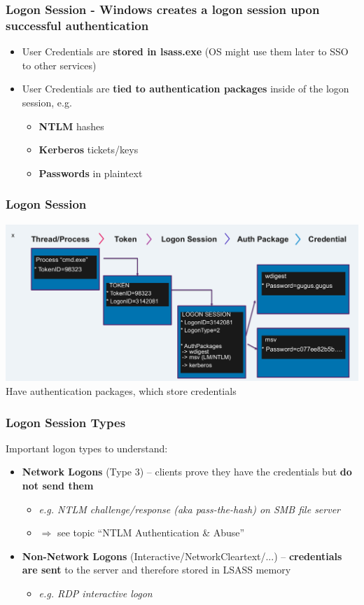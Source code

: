 \subsubsection*{Logon Session - Windows creates a logon session upon successful authentication}
\begin{itemize}
    \item User Credentials are \textbf{stored in lsass.exe} (OS might use them later to SSO to other services)
    \item User Credentials are \textbf{tied to authentication packages} inside of the logon session, e.g.
    \begin{itemize}
        \item \textbf{NTLM} hashes
        \item \textbf{Kerberos} tickets/keys
        \item \textbf{Passwords} in plaintext
    \end{itemize}
\end{itemize}

\subsubsection*{Logon Session}
\includegraphics[width=\textwidth]{resources/11-logon-session-and-token.png}
Have authentication packages, which store credentials

\subsubsection*{Logon Session Types}
Important logon types to understand:

\begin{itemize}
   \item \textbf{Network Logons} (Type 3) -- clients prove they have the credentials but \textbf{do not send them}
   \begin{itemize}
       \item \textit{e.g. NTLM challenge/response (aka pass-the-hash) on SMB file server}
       \item $\Rightarrow$ see topic ``NTLM Authentication \& Abuse''
   \end{itemize}
   
   \item \textbf{Non-Network Logons} (Interactive/NetworkCleartext/...) -- \textbf{credentials are sent} to the server and therefore stored in LSASS memory
   \begin{itemize}
       \item \textit{e.g. RDP interactive logon}
   \end{itemize}
\end{itemize}

